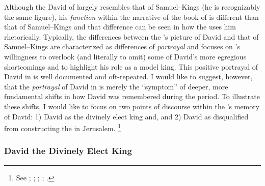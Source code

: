 Although the David of \chronicles largely resembles that of Samuel--Kings (he is recognizably the same figure), his \emph{function} within the narrative of the book of \chronicles is different than that of Samuel--Kings and that difference can be seen in how the \chronicler uses him rhetorically. Typically, the differences between the \chronicler's picture of David and that of Samuel--Kings are characterized as differences of \emph{portrayal} and focuses on \chronicler's willingness to overlook (and literally to omit) some of David's more egregious shortcomings and to highlight his role as a model king. This positive portrayal of David in \chronicles is well documented and oft-repeated. I would like to suggest, however, that the \emph{portrayal} of David in \chronicles is merely the ``symptom'' of deeper, more fundamental shifts in how David was remembered during the \secondtemple period. To illustrate these shifts, I would like to focus on two points of discourse within the \chronicler's memory of David: 1) David as the divinely elect king and, and 2) David as disqualified from constructing the \temple in Jerusalem.%
    \footnote{See \cite{jarick_frohlich2019}; \cite[347--383]{japhet2009} \cite{knoppers_biblica1995}; \cite[47--48]{japhet1993}; \cite[44--48]{klein2006}; \cite[80--85]{knoppers2003}.}

\subsubsection{David the Divinely Elect King}


